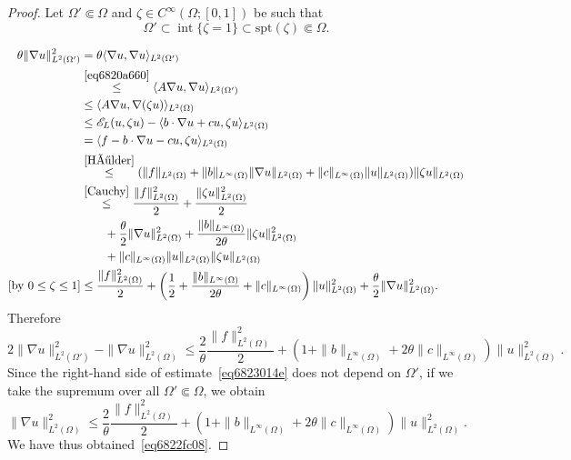 \documentclass[a4paper,9pt]{amsart}
\newcommand{\scr}[1]{\mathscr{#1}}
\newcommand{\spt}{\mathrm{spt}}
\newcommand{\grad}{\nabla}
\newcommand{\interior}{\operatorname{int}}
\theoremstyle{plain}
\theoremstyle{definition}
\theoremstyle{remark}
\begin{document}
\begin{proof}
	Let $\Omega'\Subset\Omega$ and $\zeta\in C^\infty(\Omega;[0,1])$ be such that
	\begin{equation}
		\Omega' \subset\interior\{\zeta=1\} \subset\spt(\zeta) \Subset \Omega .
	\end{equation}
	
	\begin{align}
		\theta \|\grad u\|_{L^2(\Omega')}^2
		&= \theta \langle \grad u,\grad u \rangle_{L^2(\Omega')} \\
		&\overset{\eqref{eq6820a660}}\le \langle A\grad u,\grad u \rangle_{L^2(\Omega')} \\
		&\le \langle A\grad u,\grad (\zeta u) \rangle_{L^2(\Omega)} \\
		&\le \scr E_L(u,\zeta u) - \langle b\cdot\grad u + cu , \zeta u \rangle_{L^2(\Omega)} \\
		&= \langle f - b\cdot\grad u - cu,\zeta u \rangle_{L^2(\Omega)} \\
		&\overset{\eqref{Hölder}}\le (\|f\|_{L^2(\Omega)} + \|b\|_{L^\infty(\Omega)} \|\grad u\|_{L^2(\Omega)} + \|c\|_{L^\infty(\Omega)} \|u\|_{L^2(\Omega)} ) \|\zeta u\|_{L^2(\Omega)} \\
		&\overset{\eqref{Cauchy}}\le \frac{\|f\|_{L^2(\Omega)}^2}{2} + \frac{\|\zeta u\|_{L^2(\Omega)}^2}{2} \\
		&\qquad	+ \frac{\theta}{2} \|\grad u\|_{L^2(\Omega)}^2 + \frac{\|b\|_{L^\infty(\Omega)}}{2\theta} \|\zeta u\|_{L^2(\Omega)}^2 \\
		&\qquad + \|c\|_{L^\infty(\Omega)} \|u\|_{L^2(\Omega)}\|\zeta u\|_{L^2(\Omega)} \\
	[\text{by }0\le\zeta\le1]
		&\le \frac{\|f\|_{L^2(\Omega)}^2}{2} 
			+ \left(\frac12 + \frac{\|b\|_{L^\infty(\Omega)}}{2\theta} + \|c\|_{L^\infty(\Omega)} \right) \| u\|_{L^2(\Omega)}^2 
			+ \frac{\theta}{2} \|\grad u\|_{L^2(\Omega)}^2 .
	\end{align}
	Therefore
	\begin{equation}\label{eq6823014e}
		2 \|\grad u\|_{L^2(\Omega')}^2 - \|\grad u\|_{L^2(\Omega)}^2 
		\le \frac2\theta \frac{\|f\|_{L^2(\Omega)}^2}{2}
			+ \left( 1 + \|b\|_{L^\infty(\Omega)} + 2\theta \|c\|_{L^\infty(\Omega)} \right) \| u\|_{L^2(\Omega)}^2 . 
	\end{equation}
	Since the right-hand side of estimate~\eqref{eq6823014e} does not depend on $\Omega'$, 
	if we take the supremum over all $\Omega'\Subset\Omega$, we obtain
	\begin{equation}
		\|\grad u\|_{L^2(\Omega)}^2 
		\le \frac2\theta \frac{\|f\|_{L^2(\Omega)}^2}{2}
			+ \left( 1 + \|b\|_{L^\infty(\Omega)} + 2\theta \|c\|_{L^\infty(\Omega)} \right) \| u\|_{L^2(\Omega)}^2 .
	\end{equation}
	We have thus obtained~\eqref{eq6822fc08}.
\end{proof}
\end{document}
